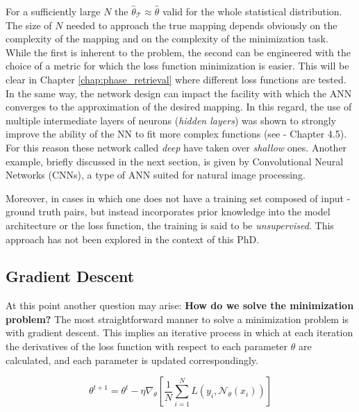 For a sufficiently large $N$ the $\hat{\theta}_{\mathcal T} \approx \hat{\theta}$ valid for the whole statistical distribution. 
The size of $N$ needed to approach the true mapping depends obviously on the complexity of the mapping and on the 
complexity of the minimization task. While the first is inherent to the problem, the second can be engineered with 
the choice of a metric for which the loss function minimization is easier. This will be clear in Chapter \ref{chap:phase_retrieval}
where different loss functions are tested. In the same way, the network design can impact the facility with which the 
ANN converges to the approximation of the desired mapping. In this regard, the use of multiple intermediate layers 
of neurons (\textit{hidden layers}) was shown to strongly improve the ability of the NN to fit more complex functions
(see \cite{prince2023understanding} - Chapter 4.5). 
For this reason these network called \textit{deep} have taken over \textit{shallow} ones. Another example, briefly 
discussed in the next section, is given by Convolutional Neural Networks (CNNs), a type of ANN suited for natural image 
processing.  

Moreover, in cases in which one does not have a training set composed of input - ground truth pairs, but instead 
incorporates prior knowledge into the model architecture or the loss function, the training is said to be 
\textit{unsupervised}. This approach has not been explored in the context of this PhD. 

\subsection{Gradient Descent}

At this point another question may arise: \textbf{How do we solve the minimization problem?}
The most straightforward manner to solve a minimization problem is with gradient descent. This implies an iterative process 
in which at each iteration the derivatives of the loss function with respect to each parameter $\theta$ are calculated, 
and each parameter is updated correspondingly. 

\begin{equation}
    \theta^{t+1}
    = \theta^{t} - \eta \nabla_{\theta} \left[ \frac{1}{N} \sum_{i=1}^N 
    L\!\left(y_i, \mathcal{N}_\theta(x_i)\right) \right]
    \label{eq:steepest_gd}
\end{equation}

